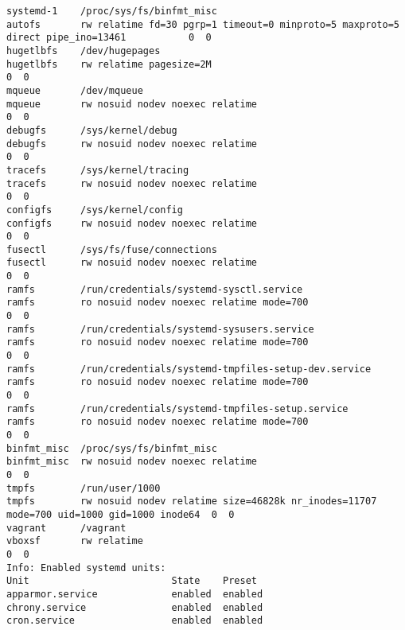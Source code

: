 \begin{longlisting}
\begin{verbatim}
systemd-1    /proc/sys/fs/binfmt_misc                             autofs       rw relatime fd=30 pgrp=1 timeout=0 minproto=5 maxproto=5 direct pipe_ino=13461           0  0
hugetlbfs    /dev/hugepages                                       hugetlbfs    rw relatime pagesize=2M                                                                  0  0
mqueue       /dev/mqueue                                          mqueue       rw nosuid nodev noexec relatime                                                          0  0
debugfs      /sys/kernel/debug                                    debugfs      rw nosuid nodev noexec relatime                                                          0  0
tracefs      /sys/kernel/tracing                                  tracefs      rw nosuid nodev noexec relatime                                                          0  0
configfs     /sys/kernel/config                                   configfs     rw nosuid nodev noexec relatime                                                          0  0
fusectl      /sys/fs/fuse/connections                             fusectl      rw nosuid nodev noexec relatime                                                          0  0
ramfs        /run/credentials/systemd-sysctl.service              ramfs        ro nosuid nodev noexec relatime mode=700                                                 0  0
ramfs        /run/credentials/systemd-sysusers.service            ramfs        ro nosuid nodev noexec relatime mode=700                                                 0  0
ramfs        /run/credentials/systemd-tmpfiles-setup-dev.service  ramfs        ro nosuid nodev noexec relatime mode=700                                                 0  0
ramfs        /run/credentials/systemd-tmpfiles-setup.service      ramfs        ro nosuid nodev noexec relatime mode=700                                                 0  0
binfmt_misc  /proc/sys/fs/binfmt_misc                             binfmt_misc  rw nosuid nodev noexec relatime                                                          0  0
tmpfs        /run/user/1000                                       tmpfs        rw nosuid nodev relatime size=46828k nr_inodes=11707 mode=700 uid=1000 gid=1000 inode64  0  0
vagrant      /vagrant                                             vboxsf       rw relatime                                                                              0  0
Info: Enabled systemd units:
Unit                         State    Preset
apparmor.service             enabled  enabled
chrony.service               enabled  enabled
cron.service                 enabled  enabled

\end{verbatim}
\end{longlisting}
